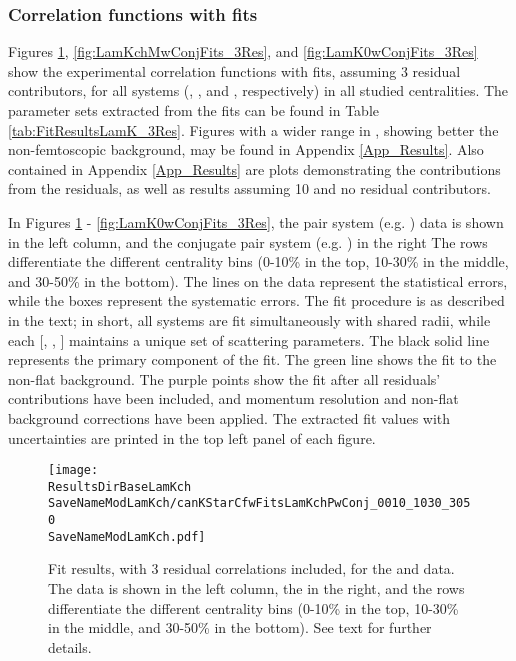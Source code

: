 \documentclass[/home/jesse/Analysis/FemtoAnalysis/AnalysisNotes/AnalysisNoteJBuxton.tex]{subfiles}
\renewcommand{\NonFlatBgdLamKch}{_NonFlatBgdCrctnLamK0LinearLamKchPolynomial}
\renewcommand{\ResNum}{_3Res}
\renewcommand{\PrimMaxDecay}{_PrimMaxDecay10fm}
\renewcommand{\SaveNameModLamKch}{\MomRes\NonFlatBgdLamKch\ResNum\PrimMaxDecay\ResMethod\ParamFixAndShareLamKch}
\begin{document}
\subsubsection{Correlation functions with fits}
\label{ResultsLamK_CorrFctnsWFits}

Figures \ref{fig:LamKchPwConjFits_3Res}, \ref{fig:LamKchMwConjFits_3Res}, and \ref{fig:LamK0wConjFits_3Res} show the experimental correlation functions with fits, assuming 3 residual contributors, for all \LamK systems (\LamKchP, \LamKchM, and \LamKs, respectively) in all studied centralities.
The parameter sets extracted from the fits can be found in Table \ref{tab:FitResultsLamK_3Res}.
Figures with a wider range in \kstar, showing better the non-femtoscopic background, may be found in Appendix \ref{App_Results}.
Also contained in Appendix \ref{App_Results} are plots demonstrating the contributions from the residuals, as well as results assuming 10 and no residual contributors.

In Figures \ref{fig:LamKchPwConjFits_3Res} - \ref{fig:LamK0wConjFits_3Res}, the pair system (e.g. \LamKchP) data is shown in the left column, and the conjugate pair system (e.g. \ALamKchM) in the right
The rows differentiate the different centrality bins (0-10\% in the top, 10-30\% in the middle, and 30-50\% in the bottom).
The lines on the data represent the statistical errors, while the boxes represent the systematic errors.  
The fit procedure is as described in the text; in short, all systems are fit simultaneously with shared radii, while each [\LamKchP, \LamKchM, \LamKs] maintains a unique set of scattering parameters.
The black solid line represents the primary \LamK component of the fit.  
The green line shows the fit to the non-flat background.
The purple points show the fit after all residuals' contributions have been included, and momentum resolution and non-flat background corrections have been applied.
The extracted fit values with uncertainties are printed in the top left panel of each figure.

\begin{figure}[h]
  \centering
  \texttt{[image: \\ResultsDirBaseLamKch\\SaveNameModLamKch/canKStarCfwFitsLamKchPwConj\_0010\_1030\_3050\\SaveNameModLamKch.pdf]}
  \caption[\LamKchPALamKchM data with fits]
  {
  Fit results, with 3 residual correlations included, for the \LamKchP and \ALamKchM data.
  The \LamKchP data is shown in the left column, the \ALamKchM in the right, and the rows differentiate the different centrality bins (0-10\% in the top, 10-30\% in the middle, and 30-50\% in the bottom).
  See text for further details.
  }
  \label{fig:LamKchPwConjFits_3Res}
\end{figure}
\end{document}
